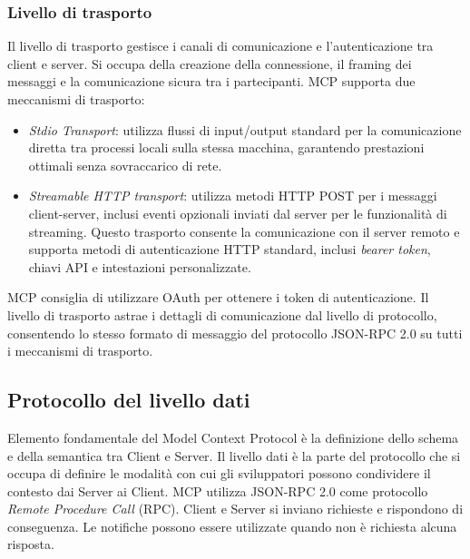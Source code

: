 \subsubsection{Livello di trasporto}
Il livello di trasporto gestisce i canali di comunicazione e l'autenticazione tra client e server. Si occupa della creazione della connessione, il framing dei messaggi e la comunicazione sicura tra i partecipanti.
MCP supporta due meccanismi di trasporto:
\begin{itemize}
\item \textit{Stdio Transport}: utilizza flussi di input/output standard per la comunicazione diretta tra processi locali sulla stessa macchina, garantendo prestazioni ottimali senza sovraccarico di rete.
\item \textit{Streamable HTTP transport}: utilizza metodi HTTP POST per i messaggi client-server, inclusi eventi opzionali inviati dal server per le funzionalità di streaming. Questo trasporto consente la comunicazione con il server remoto e supporta metodi di autenticazione HTTP standard, inclusi \textit{bearer token}, chiavi API e intestazioni personalizzate.
\end{itemize}
MCP consiglia di utilizzare OAuth per ottenere i token di autenticazione.
Il livello di trasporto astrae i dettagli di comunicazione dal livello di protocollo, consentendo lo stesso formato di messaggio del protocollo JSON-RPC 2.0 su tutti i meccanismi di trasporto.
\cite{modelcontextprotocol2024arch}

\subsection{Protocollo del livello dati}
Elemento fondamentale del Model Context Protocol è la definizione dello schema e della semantica tra Client e Server. Il livello dati è la parte del protocollo che si occupa di definire le modalità 
con cui gli sviluppatori possono condividere il contesto dai Server ai Client. MCP utilizza JSON-RPC 2.0 come protocollo \textit{Remote Procedure Call} (RPC). Client e Server 
si inviano richieste e rispondono di conseguenza. Le notifiche possono essere utilizzate quando non è richiesta alcuna risposta.
\cite{modelcontextprotocol2024arch}

